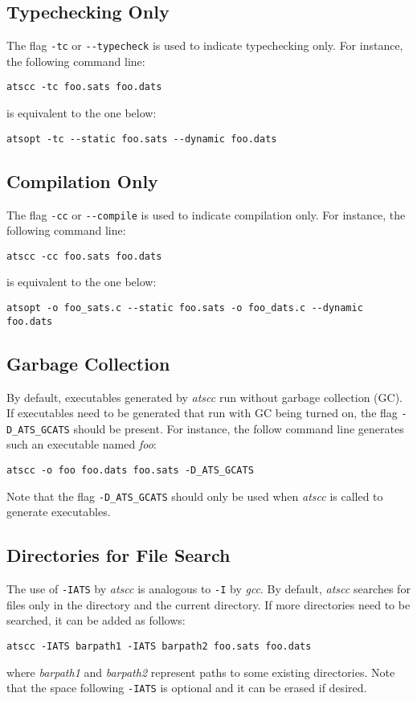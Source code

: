 \subsection{Typechecking Only}
The flag \verb`-tc` or \verb`--typecheck` is used to indicate typechecking
only. For instance, the following command line:
\begin{verbatim}
atscc -tc foo.sats foo.dats
\end{verbatim}
is equivalent to the one below:
\begin{verbatim}
atsopt -tc --static foo.sats --dynamic foo.dats
\end{verbatim}

\subsection{Compilation Only}
The flag \verb`-cc` or \verb`--compile` is used to indicate compilation only.
For instance, the following command line:
\begin{verbatim}
atscc -cc foo.sats foo.dats
\end{verbatim}
is equivalent to the one below:
\begin{verbatim}
atsopt -o foo_sats.c --static foo.sats -o foo_dats.c --dynamic foo.dats
\end{verbatim}

\subsection{Garbage Collection}
By default, executables generated by {\it atscc} run without garbage
collection (GC). If executables need to be generated that run with GC being
turned on, the flag \verb`-D_ATS_GCATS` should be present.  For instance,
the follow command line generates such an executable named {\it foo}:
\begin{verbatim}
atscc -o foo foo.dats foo.sats -D_ATS_GCATS
\end{verbatim}
Note that the flag \verb`-D_ATS_GCATS` should only be used when {\it atscc}
is called to generate executables.

\subsection{Directories for File Search}
The use of \verb`-IATS` by {\it atscc} is analogous to \verb`-I` by {\it gcc}.
By default, {\it atscc} searches for files only in the directory \ATSHOME
and the current directory. If more directories need to be searched, it can
be added as follows:
\begin{verbatim}
atscc -IATS barpath1 -IATS barpath2 foo.sats foo.dats
\end{verbatim}
where {\it barpath1} and {\it barpath2} represent paths to some existing directories.
Note that the space following \verb`-IATS` is optional and it can be erased
if desired.

